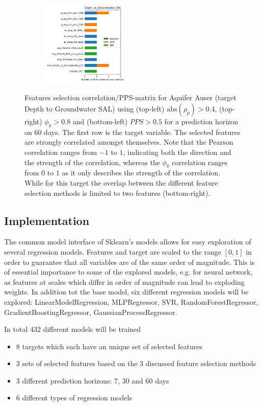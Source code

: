 \documentclass{article}
\begin{document}
\begin{figure}
% 
     \begin{subfigure}
         \centering
         \includegraphics[width=0.45\textwidth]{figs/feature_selection_summary_Aquifer_Auser_Depth_to_Groundwater_SAL.pdf}
     \end{subfigure}
\caption{Features selection correlation/PPS-matrix for Aquifer Auser (target Depth to Groundwater SAL) using (top-left) $ \mathrm{abs}(\rho_p) > 0.4$, (top-right) $\phi_k > 0.8$ and (bottom-left) $PPS > 0.5$ for a prediction horizon on 60 days. The first row is the target variable. The selected features are strongly correlated amongst themselves. Note that the Pearson correlation ranges from $-1$ to $1$, indicating both the direction and the strength of the correlation, whereas the $\phi_k$ correlation ranges from $0$ to $1$ as it only describes the strength of the correlation. While for this target the overlap between the different feature selection methods is limited to two features (bottom-right).}
\label{fig:corr_auser}
\end{figure}

\subsection*{Implementation}

The common model interface of Sklearn's models allows for easy exploration of several regression models. Features and target are scaled to the range $[0, 1]$ in order to guarantee that all variables are of the same order of magnitude. This is of essential importance to some of the explored models, e.g. for neural network, as features at scales which differ in order of magnitude can lead to exploding weights. In addition tot the base model, six different regression  models will be explored: LinearModelRegression, MLPRegressor, SVR, RandomForestRegressor, GradientBoostingRegressor, GaussianProcessRegressor. 

In total 432 different models will be trained
\begin{itemize}
\item 8 targets which each have an unique set of selected features
\item 3 sets of selected features based on the 3 discussed feature selection methods 
\item 3 different prediction horizons: 7, 30 and 60 days
\item 6 different types of regression models
\end{itemize}
\end{document}
